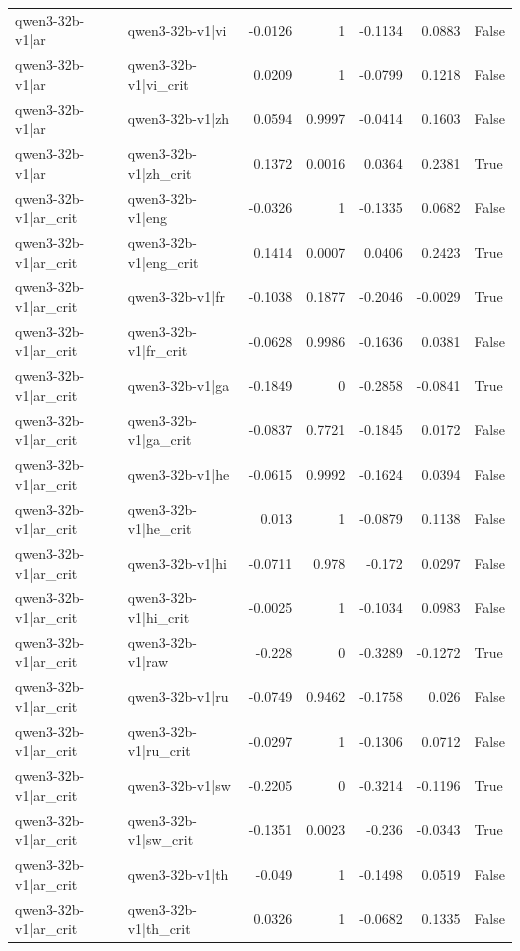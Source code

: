 \begin{table}
\begin{tabular}{l l r r r r l}
qwen3-32b-v1|ar & qwen3-32b-v1|vi & -0.0126 & 1 & -0.1134 & 0.0883 & False \\
qwen3-32b-v1|ar & qwen3-32b-v1|vi_crit & 0.0209 & 1 & -0.0799 & 0.1218 & False \\
qwen3-32b-v1|ar & qwen3-32b-v1|zh & 0.0594 & 0.9997 & -0.0414 & 0.1603 & False \\
qwen3-32b-v1|ar & qwen3-32b-v1|zh_crit & 0.1372 & 0.0016 & 0.0364 & 0.2381 & True \\
qwen3-32b-v1|ar_crit & qwen3-32b-v1|eng & -0.0326 & 1 & -0.1335 & 0.0682 & False \\
qwen3-32b-v1|ar_crit & qwen3-32b-v1|eng_crit & 0.1414 & 0.0007 & 0.0406 & 0.2423 & True \\
qwen3-32b-v1|ar_crit & qwen3-32b-v1|fr & -0.1038 & 0.1877 & -0.2046 & -0.0029 & True \\
qwen3-32b-v1|ar_crit & qwen3-32b-v1|fr_crit & -0.0628 & 0.9986 & -0.1636 & 0.0381 & False \\
qwen3-32b-v1|ar_crit & qwen3-32b-v1|ga & -0.1849 & 0 & -0.2858 & -0.0841 & True \\
qwen3-32b-v1|ar_crit & qwen3-32b-v1|ga_crit & -0.0837 & 0.7721 & -0.1845 & 0.0172 & False \\
qwen3-32b-v1|ar_crit & qwen3-32b-v1|he & -0.0615 & 0.9992 & -0.1624 & 0.0394 & False \\
qwen3-32b-v1|ar_crit & qwen3-32b-v1|he_crit & 0.013 & 1 & -0.0879 & 0.1138 & False \\
qwen3-32b-v1|ar_crit & qwen3-32b-v1|hi & -0.0711 & 0.978 & -0.172 & 0.0297 & False \\
qwen3-32b-v1|ar_crit & qwen3-32b-v1|hi_crit & -0.0025 & 1 & -0.1034 & 0.0983 & False \\
qwen3-32b-v1|ar_crit & qwen3-32b-v1|raw & -0.228 & 0 & -0.3289 & -0.1272 & True \\
qwen3-32b-v1|ar_crit & qwen3-32b-v1|ru & -0.0749 & 0.9462 & -0.1758 & 0.026 & False \\
qwen3-32b-v1|ar_crit & qwen3-32b-v1|ru_crit & -0.0297 & 1 & -0.1306 & 0.0712 & False \\
qwen3-32b-v1|ar_crit & qwen3-32b-v1|sw & -0.2205 & 0 & -0.3214 & -0.1196 & True \\
qwen3-32b-v1|ar_crit & qwen3-32b-v1|sw_crit & -0.1351 & 0.0023 & -0.236 & -0.0343 & True \\
qwen3-32b-v1|ar_crit & qwen3-32b-v1|th & -0.049 & 1 & -0.1498 & 0.0519 & False \\
qwen3-32b-v1|ar_crit & qwen3-32b-v1|th_crit & 0.0326 & 1 & -0.0682 & 0.1335 & False \\

\end{tabular}
\end{table}
